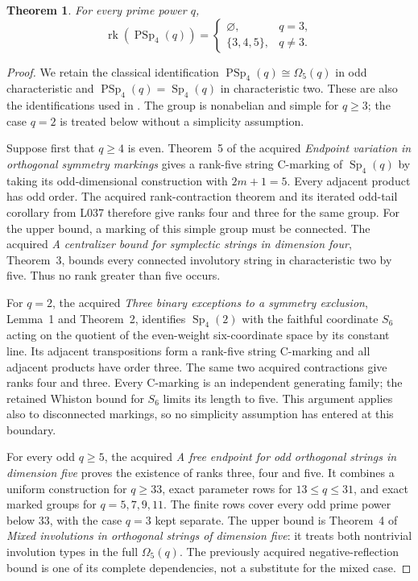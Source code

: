 \documentclass[11pt,a4paper]{article}
\newtheorem{theorem}{Theorem}
\newcommand{\rk}{\operatorname{rk}}
\newcommand{\PSp}{\operatorname{PSp}}
\newcommand{\Sp}{\operatorname{Sp}}
\newcommand{\Om}{\Omega}
\begin{document}
\begin{theorem}\label{main}
For every prime power $q$,
\[
 \rk(\PSp_4(q))=
 \begin{cases}
 \varnothing,&q=3,\\
 \{3,4,5\},&q\ne3.
 \end{cases}
\]
\end{theorem}
\begin{proof}
We retain the classical identification
$\PSp_4(q)\cong\Om_5(q)$ in odd characteristic and
$\PSp_4(q)=\Sp_4(q)$ in characteristic two. These are also the
identifications used in \cite[\S1]{B}. The group is nonabelian and
simple for $q\ge3$; the case $q=2$ is treated below without a
simplicity assumption.

Suppose first that $q\ge4$ is even. Theorem~5 of the acquired
\emph{Endpoint variation in orthogonal symmetry markings} gives a
rank-five string C-marking of $\Sp_4(q)$ by taking its odd-dimensional
construction with $2m+1=5$. Every adjacent product has odd order.
The acquired rank-contraction theorem and its iterated odd-tail
corollary from L037 therefore give ranks four and three for the
same group. For the upper bound, a marking of this simple group
must be connected. The acquired \emph{A centralizer bound for
symplectic strings in dimension four}, Theorem~3, bounds every
connected involutory string in characteristic two by five. Thus no
rank greater than five occurs.

For $q=2$, the acquired \emph{Three binary exceptions to a symmetry
exclusion}, Lemma~1 and Theorem~2, identifies $\Sp_4(2)$ with the
faithful coordinate $S_6$ acting on the quotient of the even-weight
six-coordinate space by its constant line. Its adjacent transpositions
form a rank-five string C-marking and all adjacent products have
order three. The same two acquired contractions give ranks four and
three. Every C-marking is an independent generating family; the
retained Whiston bound for $S_6$ limits its length to five. This
argument applies also to disconnected markings, so no simplicity
assumption has entered at this boundary.

For every odd $q\ge5$, the acquired \emph{A free endpoint for odd orthogonal strings in dimension five} proves the existence of ranks three, four
and five. It combines a uniform construction for $q\ge33$, exact
parameter rows for $13\le q\le31$, and exact marked groups for
$q=5,7,9,11$. The finite rows cover every odd prime power below
33, with the case $q=3$ kept separate. The upper bound is Theorem~4
of \emph{Mixed involutions in orthogonal strings of dimension five}:
it treats both nontrivial involution types in the full $\Om_5(q)$.
The previously acquired negative-reflection bound is one of its
complete dependencies, not a substitute for the mixed case.


\end{proof}
\end{document}
